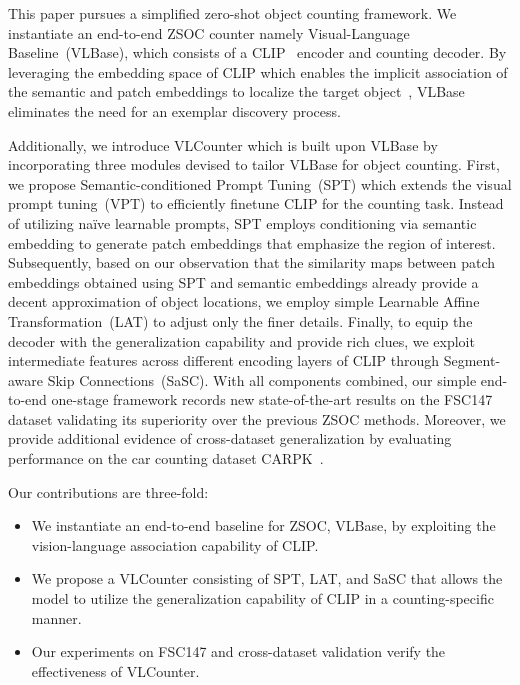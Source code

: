 This paper pursues a simplified zero-shot object counting framework.
We instantiate an end-to-end ZSOC counter namely Visual-Language Baseline~(VLBase), which consists of a CLIP~\cite{2021clip} encoder and counting decoder.
By leveraging the embedding space of CLIP which enables the implicit association of the semantic and patch embeddings to localize the target object~\cite{2022maskclip, li2023clipsurgery}, VLBase eliminates the need for an exemplar discovery process.



Additionally, we introduce VLCounter which is built upon VLBase by incorporating three modules devised to tailor VLBase for object counting.
First, we propose Semantic-conditioned Prompt Tuning~(SPT) which extends the visual prompt tuning~(VPT) to efficiently finetune CLIP for the counting task.
Instead of utilizing na\"ive learnable prompts, SPT employs conditioning via semantic embedding to generate patch embeddings that emphasize the region of interest.
Subsequently, based on our observation that the similarity maps between patch embeddings obtained using SPT and semantic embeddings already provide a decent approximation of object locations, we employ simple Learnable Affine Transformation~(LAT) to adjust only the finer details.
Finally, to equip the decoder with the generalization capability and provide rich clues, we exploit intermediate features across different encoding layers of CLIP through Segment-aware Skip Connections~(SaSC).
With all components combined, our simple end-to-end one-stage framework records new state-of-the-art results on the FSC147~\cite{2021FAMNet} dataset validating its superiority over the previous ZSOC methods.
Moreover, we provide additional evidence of cross-dataset generalization by evaluating performance on the car counting dataset CARPK~\cite{2017drone}.

Our contributions are three-fold:
\begin{itemize}
    \item We instantiate an end-to-end baseline for ZSOC, VLBase, by exploiting the vision-language association capability of CLIP. 
    \item We propose a VLCounter consisting of SPT, LAT, and SaSC that allows the model to utilize the generalization capability of CLIP in a counting-specific manner.
    \item Our experiments on FSC147 and cross-dataset validation verify the effectiveness of VLCounter.
\end{itemize}